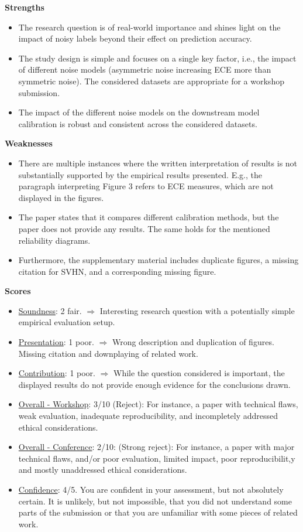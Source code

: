 \textbf{Strengths}

\begin{itemize}
    \item The research question is of real-world importance and shines light on the impact of noisy labels beyond their effect on prediction accuracy.
    \item The study design is simple and focuses on a single key factor, i.e., the impact of different noise models (asymmetric noise increasing ECE more than symmetric noise). The considered datasets are appropriate for a workshop submission.
    \item The impact of the different noise models on the downstream model calibration is robust and consistent across the considered datasets.
\end{itemize}

\textbf{Weaknesses}
\begin{itemize}
    \item There are multiple instances where the written interpretation of results is not substantially supported by the empirical results presented. E.g., the paragraph interpreting Figure 3 refers to ECE measures, which are not displayed in the figures.
    \item The paper states that it compares different calibration methods, but the paper does not provide any results. The same holds for the mentioned reliability diagrams.
    \item Furthermore, the supplementary material includes duplicate figures, a missing citation for SVHN, and a corresponding missing figure.
\end{itemize}


\textbf{Scores}
\begin{itemize}
    \item \underline{Soundness}: 2 fair. $\Rightarrow$ Interesting research question with a potentially simple empirical evaluation setup.
    \item \underline{Presentation}: 1 poor. $\Rightarrow$ Wrong description and duplication of figures. Missing citation and downplaying of related work.
    \item \underline{Contribution}: 1 poor. $\Rightarrow$ While the question considered is important, the displayed results do not provide enough evidence for the conclusions drawn.
    \item \underline{Overall - Workshop}: 3/10 (Reject): For instance, a paper with technical flaws, weak evaluation, inadequate reproducibility, and incompletely addressed ethical considerations.
    \item \underline{Overall - Conference}: 2/10: (Strong reject): For instance, a paper with major technical flaws, and/or poor evaluation, limited impact, poor reproducibilit,y and mostly unaddressed ethical considerations.
    \item \underline{Confidence}: 4/5. You are confident in your assessment, but not absolutely certain. It is unlikely, but not impossible, that you did not understand some parts of the submission or that you are unfamiliar with some pieces of related work.
\end{itemize}


